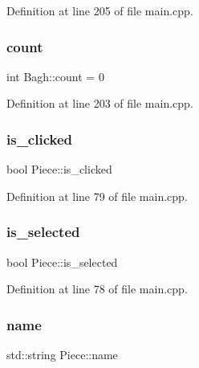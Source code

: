 Definition at line 205 of file main.\+cpp.

\mbox{\label{class_bagh_a86a681a06d8a497159f08dceb735c5e9}} 
\subsubsection{\texorpdfstring{count}{count}}
{\footnotesize\ttfamily int Bagh\+::count = 0\hspace{0.3cm}{\ttfamily [static]}}



Definition at line 203 of file main.\+cpp.

\mbox{\label{class_piece_ab2ba8aa3a4471ff1a5400fe0617657cb}} 
\subsubsection{\texorpdfstring{is\_clicked}{is\_clicked}}
{\footnotesize\ttfamily bool Piece\+::is\+\_\+clicked\hspace{0.3cm}{\ttfamily [inherited]}}



Definition at line 79 of file main.\+cpp.

\mbox{\label{class_piece_a21b7b54849acd46163b4b6281b5b0e57}} 
\subsubsection{\texorpdfstring{is\_selected}{is\_selected}}
{\footnotesize\ttfamily bool Piece\+::is\+\_\+selected\hspace{0.3cm}{\ttfamily [inherited]}}



Definition at line 78 of file main.\+cpp.

\mbox{\label{class_piece_aceb5b0dda6aa7ac881abe103bb98ac7e}} 
\subsubsection{\texorpdfstring{name}{name}}
{\footnotesize\ttfamily std\+::string Piece\+::name\hspace{0.3cm}{\ttfamily [inherited]}}



